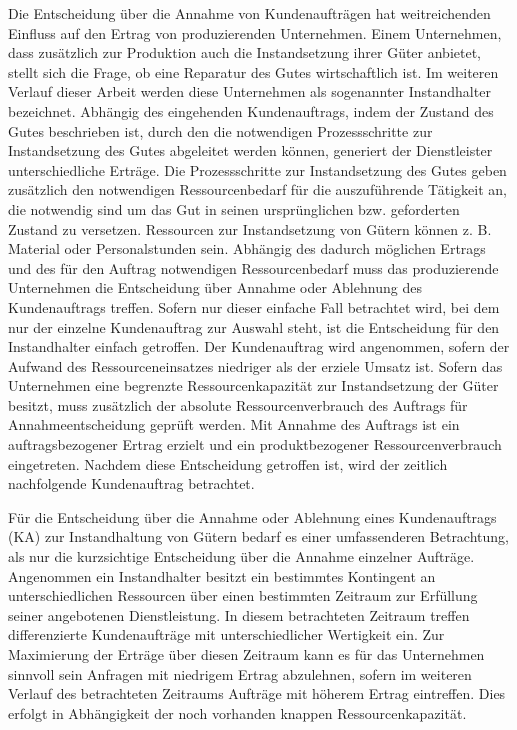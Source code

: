 Die Entscheidung über die Annahme von Kundenaufträgen hat weitreichenden Einfluss auf den Ertrag von produzierenden Unternehmen. Einem Unternehmen, dass zusätzlich zur Produktion auch die Instandsetzung ihrer Güter anbietet, stellt sich die Frage, ob eine Reparatur des Gutes wirtschaftlich ist. Im weiteren Verlauf dieser Arbeit werden diese Unternehmen als sogenannter Instandhalter bezeichnet. Abhängig des eingehenden Kundenauftrags, indem der Zustand des Gutes beschrieben ist, durch den die notwendigen Prozessschritte zur Instandsetzung des Gutes abgeleitet werden können, generiert der Dienstleister unterschiedliche Erträge. Die Prozessschritte zur Instandsetzung des Gutes geben zusätzlich den notwendigen Ressourcenbedarf für die auszuführende Tätigkeit an, die notwendig sind um das Gut in seinen ursprünglichen bzw. geforderten Zustand zu versetzen. Ressourcen zur Instandsetzung von Gütern können z. B. Material oder Personalstunden sein. Abhängig des dadurch möglichen Ertrags und des für den Auftrag notwendigen Ressourcenbedarf muss das produzierende Unternehmen die Entscheidung über Annahme oder Ablehnung des Kundenauftrags treffen. Sofern nur dieser einfache Fall betrachtet wird, bei dem nur der einzelne Kundenauftrag zur Auswahl steht, ist die Entscheidung für den Instandhalter einfach getroffen. Der Kundenauftrag wird angenommen, sofern der Aufwand des Ressourceneinsatzes niedriger als der erziele Umsatz ist.
Sofern das Unternehmen eine begrenzte Ressourcenkapazität zur Instandsetzung der Güter besitzt, muss zusätzlich der absolute Ressourcenverbrauch des Auftrags für Annahmeentscheidung geprüft werden. Mit Annahme des Auftrags ist ein auftragsbezogener Ertrag erzielt und ein produktbezogener Ressourcenverbrauch eingetreten. Nachdem diese Entscheidung getroffen ist, wird der zeitlich nachfolgende Kundenauftrag betrachtet.

Für die Entscheidung über die Annahme oder Ablehnung eines Kundenauftrags (KA) zur Instandhaltung von Gütern bedarf es einer umfassenderen Betrachtung, als nur die kurzsichtige Entscheidung über die Annahme einzelner Aufträge. Angenommen ein Instandhalter besitzt ein bestimmtes Kontingent an unterschiedlichen Ressourcen über einen bestimmten Zeitraum zur Erfüllung seiner angebotenen Dienstleistung. In diesem betrachteten Zeitraum treffen differenzierte Kundenaufträge mit unterschiedlicher Wertigkeit ein. Zur Maximierung der Erträge über diesen Zeitraum kann es für das Unternehmen sinnvoll sein Anfragen mit niedrigem Ertrag abzulehnen, sofern im weiteren Verlauf des betrachteten Zeitraums Aufträge mit höherem Ertrag eintreffen. Dies erfolgt in Abhängigkeit der noch vorhanden knappen Ressourcenkapazität.

